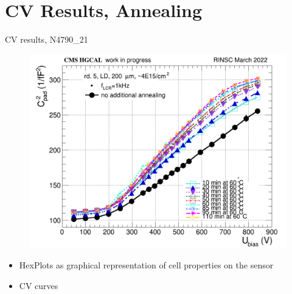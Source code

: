 \documentclass{beamer}
\begin{document}
\section{CV Results, Annealing}

\begin{frame}{CV results, N4790\_21}
  \begin{figure}
      \includegraphics[width=1.0\textwidth]{plots/annealing_CV_ch101_N4790_21.png}    
  \end{figure}
  \begin{itemize}
    \item HexPlots as graphical representation of cell properties on the sensor
    \item CV curves
  \end{itemize}
\end{frame}
\end{document}
